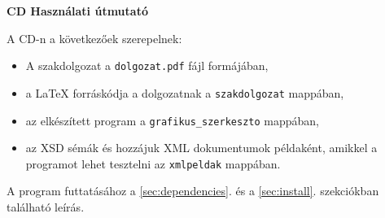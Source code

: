 \pagestyle{empty}

\noindent \textbf{\Large CD Használati útmutató}

\vskip 1cm
A CD-n a következőek szerepelnek:
\begin{itemize}
\item A szakdolgozat a \texttt{dolgozat.pdf} fájl formájában,
\item a LaTeX forráskódja a dolgozatnak a \texttt{szakdolgozat} mappában,
\item az elkészített program a \texttt{grafikus\_szerkeszto} mappában,
\item az XSD sémák és hozzájuk XML dokumentumok példaként, amikkel a programot lehet tesztelni az \texttt{xmlpeldak} mappában.
\end{itemize}
A program futtatásához a \ref{sec:dependencies}. és a \ref{sec:install}. szekciókban található leírás.